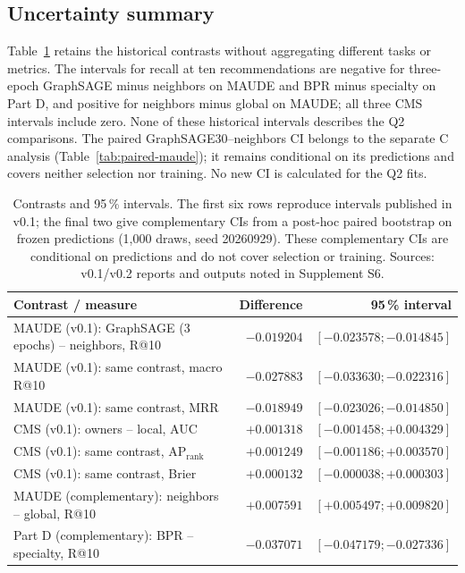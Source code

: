 \subsection{Uncertainty summary}

Table~\ref{tab:ci} retains the historical contrasts without aggregating different tasks or metrics. The intervals for recall at ten recommendations are negative for three-epoch GraphSAGE minus neighbors on MAUDE and BPR minus specialty on Part D, and positive for neighbors minus global on MAUDE; all three CMS intervals include zero. None of these historical intervals describes the Q2 comparisons. The paired GraphSAGE30--neighbors CI belongs to the separate C analysis (Table~\ref{tab:paired-maude}); it remains conditional on its predictions and covers neither selection nor training. No new CI is calculated for the Q2 fits.

\begin{table}[!htbp]
\centering\small
\caption{Contrasts and 95\,\% intervals. The first six rows reproduce intervals published in v0.1; the final two give complementary CIs from a post-hoc paired bootstrap on frozen predictions (1,000 draws, seed 20260929). These complementary CIs are conditional on predictions and do not cover selection or training. Sources: v0.1/v0.2 reports and outputs noted in Supplement S6\cite{hgbresults}.}
\label{tab:ci}
\begin{tabularx}{\linewidth}{@{}Xrr@{}}
\toprule
Contrast / measure & Difference & 95\,\% interval\\
\midrule
MAUDE (v0.1): GraphSAGE (3 epochs) -- neighbors, R@10 & $-0.019204$ & $[-0.023578;-0.014845]$\\
MAUDE (v0.1): same contrast, macro R@10 & $-0.027883$ & $[-0.033630;-0.022316]$\\
MAUDE (v0.1): same contrast, MRR & $-0.018949$ & $[-0.023026;-0.014850]$\\
CMS (v0.1): owners -- local, AUC & $+0.001318$ & $[-0.001458;+0.004329]$\\
CMS (v0.1): same contrast, $\mathrm{AP}_{\mathrm{rank}}$ & $+0.001249$ & $[-0.001186;+0.003570]$\\
CMS (v0.1): same contrast, Brier & $+0.000132$ & $[-0.000038;+0.000303]$\\
MAUDE (complementary): neighbors -- global, R@10 & $+0.007591$ & $[+0.005497;+0.009820]$\\
Part D (complementary): BPR -- specialty, R@10 & $-0.037071$ & $[-0.047179;-0.027336]$\\
\bottomrule
\end{tabularx}
\end{table}

